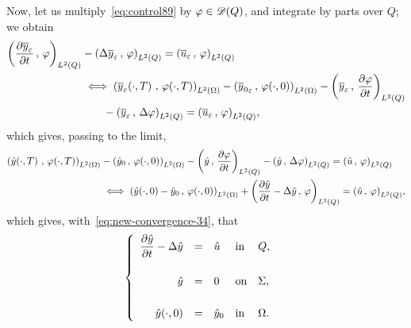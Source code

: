 Now, let us multiply~\eqref{eq:control89} by $\varphi\in\mathscr{D}(Q)$, and
integrate by parts over $Q$; we obtain
\begin{equation*}
    \begin{split}
        \scalaireq{\primetemps{\bareps{y}}}{\vphi} &- \scalaireq{%
            \Delta\bareps{y}
        }{%
            \vphi%
        } = \scalaireq{\bareps{u}}{\vphi}\\
        &\iff \scalaireohm{%
            \condfinale{\bareps{y}}
        }{%
            \condfinale{\vphi}
        } - \scalaireohm{%
            {\bar{y}_{0}}_{\veps}
        }{%
            \condinitiale{\vphi}
        } - \scalaireq{%
            \bareps{y}
        }{%
            \primetemps{\vphi}
        }\\
        &\qquad - \scalaireq{%
            \bareps{y}
        }{%
            \Delta\vphi%
        } = \scalaireq{\bareps{u}}{\vphi},
    \end{split}
\end{equation*}
which gives, passing to the limit,
\begin{equation*}
    \begin{split}
        \scalaireohm{%
            \condfinale{\hat{y}}
        }{%
            \condfinale{\vphi}
        } & - \scalaireohm{%
            {\hat{y}}_{0}
        }{%
            \condinitiale{\vphi}
        } - \scalaireq{%
            \hat{y}
        }{%
            \primetemps{\vphi}
        } - \scalaireq{%
            \hat{y}
        }{%
            \Delta\vphi%
        } = \scalaireq{\hat{u}}{\vphi}\\
        &\iff \scalaireohm{%
            \condinitiale{\hat{y}} - {\hat{y}}_{0}
        }{%
            \condinitiale{\vphi}
        } + \scalaireq{%
            \primetemps{\hat{y}} - \Delta\hat{y}
        }{%
            \vphi%
        } = \scalaireq{\hat{u}}{\vphi},
    \end{split}
\end{equation*}
which gives, with~\eqref{eq:new-convergence-34}, that
\begin{equation}\label{eq:control102}
    \begin{cases}\displaystyle
        \begin{array}{rclll}
            \dfrac{\partial{}\hat{y}}{\partial{}t} - \Delta\hat{y} & = & \hat{u} &
            \text{in} & Q,\\
            \\
            \hat{y} & = & 0 & \text{on} & \Sigma,\\
            \\
            {\hat{y}}\!\left({\cdot, 0}\right) & = & {\hat{y}}_{0} & \text{in} &
            \Omega.
        \end{array}
    \end{cases}
\end{equation}
